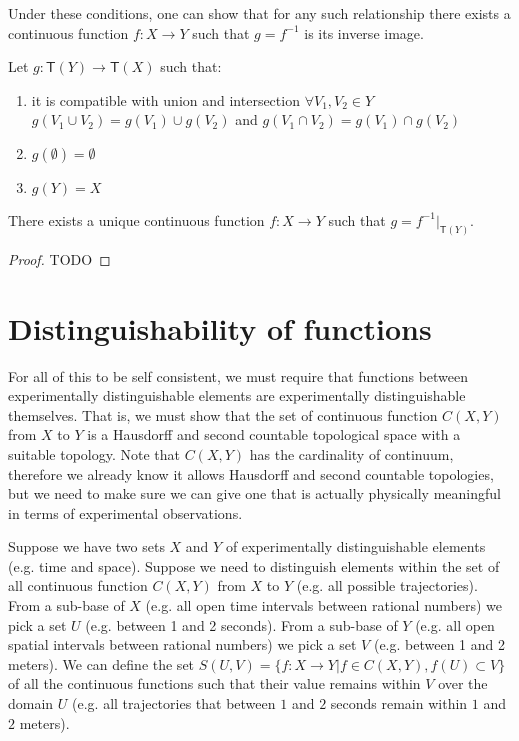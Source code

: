 \documentclass[11pt,letterpaper,fleqn]{memoir} %
\begin{document}
Under these conditions, one can show that for any such relationship there exists a continuous function $f: X \rightarrow Y$ such that $g=f^{-1}$ is its inverse image.

\begin{prop}
	Let $g: \mathsf{T}(Y) \rightarrow \mathsf{T}(X)$ such that:
	\begin{enumerate}
		\item it is compatible with union and intersection $\forall V_1, V_2 \in Y$ $g(V_1 \cup V_2)=g(V_1)\cup g(V_2)$ and $g(V_1 \cap V_2)=g(V_1)\cap g(V_2)$
		\item $g(\emptyset) = \emptyset$
		\item $g(Y) = X$
	\end{enumerate}
    There exists a unique continuous function $f: X \rightarrow Y$ such that $g = f^{-1} |_{\mathsf{T}(Y)}$.
\end{prop}

\begin{proof}
	TODO
\end{proof}

\section{Distinguishability of functions}

For all of this to be self consistent, we must require that functions between experimentally distinguishable elements are  experimentally distinguishable themselves. That is, we must show that the set of continuous function $C(X,Y)$ from $X$ to $Y$ is a Hausdorff and second countable topological space with a suitable topology. Note that $C(X,Y)$ has the cardinality of continuum, therefore we already know it allows Hausdorff and second countable topologies, but we need to make sure we can give one that is actually physically meaningful in terms of experimental observations.

Suppose we have two sets $X$ and $Y$ of experimentally distinguishable elements (e.g. time and space). Suppose we need to distinguish elements within the set of all continuous function $C(X,Y)$ from $X$ to $Y$ (e.g. all possible trajectories). From a sub-base of $X$ (e.g. all open time intervals between rational numbers) we pick a set $U$ (e.g. between 1 and 2 seconds). From a sub-base of $Y$ (e.g. all open spatial intervals between rational numbers) we pick a set $V$ (e.g. between 1 and 2 meters). We can define the set $S(U,V) = \{f: X \rightarrow Y | f \in C(X,Y), f(U) \subset V\}$ of all the continuous functions such that their value remains within $V$ over the domain $U$ (e.g. all trajectories that between $1$ and $2$ seconds remain within $1$ and $2$ meters).
\end{document}
